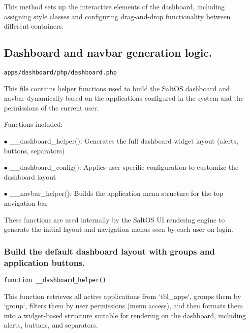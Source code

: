 \documentclass[a4paper]{article}
\begin{document}
This method sets up the interactive elements of the dashboard, including assigning style classes
and configuring drag-and-drop functionality between different containers.

\hypertarget{toc44}{}
\subsection{Dashboard and navbar generation logic.}

\begin{lstlisting}
apps/dashboard/php/dashboard.php
\end{lstlisting}

This file contains helper functions used to build the SaltOS dashboard and navbar
dynamically based on the applications configured in the system and the permissions
of the current user.

Functions included:

\begin{compactitem}
\item[\color{myblue}$\bullet$] \_\_dashboard\_helper(): Generates the full dashboard widget layout (alerts, buttons, separators)
\item[\color{myblue}$\bullet$] \_\_dashboard\_config(): Applies user-specific configuration to customize the dashboard layout
\item[\color{myblue}$\bullet$] \_\_navbar\_helper(): Builds the application menu structure for the top navigation bar
\end{compactitem}

These functions are used internally by the SaltOS UI rendering engine to generate
the initial layout and navigation menus seen by each user on login.

\hypertarget{toc45}{}
\subsubsection{Build the default dashboard layout with groups and application buttons.}

\begin{lstlisting}
function __dashboard_helper()
\end{lstlisting}

This function retrieves all active applications from `tbl\_apps`,
groups them by `group`, filters them by user permissions (menu access),
and then formats them into a widget-based structure suitable for rendering
on the dashboard, including alerts, buttons, and separators.
\end{document}

